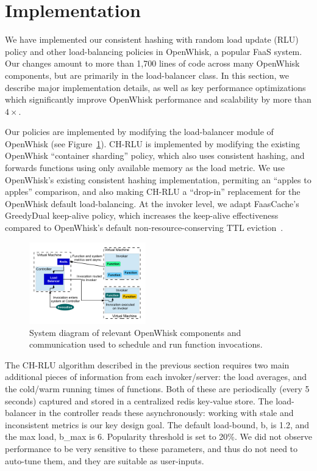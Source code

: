 \section{Implementation}
\label{sec:impl}

We have implemented our consistent hashing with random load update (RLU) policy and other load-balancing policies in OpenWhisk, a popular FaaS system.
Our changes amount to more than 1,700 lines of code across many OpenWhisk components, but are primarily in the load-balancer class. 
In this section, we describe major implementation details, as well as key performance optimizations which significantly improve OpenWhisk performance and scalability by more than $4\times$. 

Our policies are implemented by modifying the load-balancer module of OpenWhisk (see Figure~\ref{fig:sys-diag}).
CH-RLU is implemented by modifying the existing OpenWhisk ``container sharding'' policy, which also uses consistent hashing, and forwards functions using only available memory as the load metric.
We use OpenWhisk's existing consistent hashing implementation, permiting an ``apples to apples'' comparison, and also making CH-RLU a ``drop-in'' replacement for the OpenWhisk default load-balancing. 
At the invoker level, we adapt FaasCache's GreedyDual keep-alive policy, which increases the keep-alive effectiveness compared to OpenWhisk's default non-resource-conserving TTL eviction~\cite{faascache-asplos21}. 

\begin{figure}  \includegraphics[width=0.45\textwidth]{chrlu/faaslb-osdi22/figs/sys-diag.pdf}
  \caption{System diagram of relevant OpenWhisk components and communication used to schedule and run function invocations.}
  \label{fig:sys-diag}
\end{figure}

The CH-RLU algorithm described in the previous section requires two main additional pieces of information from each invoker/server: the load averages, and the cold/warm running times of functions. 
Both of these are periodically (every 5 seconds) captured and stored in a centralized redis key-value store.
The load-balancer in the controller reads these asynchronously: working with stale and inconsistent metrics is our key design goal. 
The default load-bound, b, is 1.2, and the max load, b\_max is 6. Popularity threshold is set to 20\%.
We did not observe performance to be very sensitive to these parameters, and thus do not need to auto-tune them, and they are suitable as user-inputs. 

